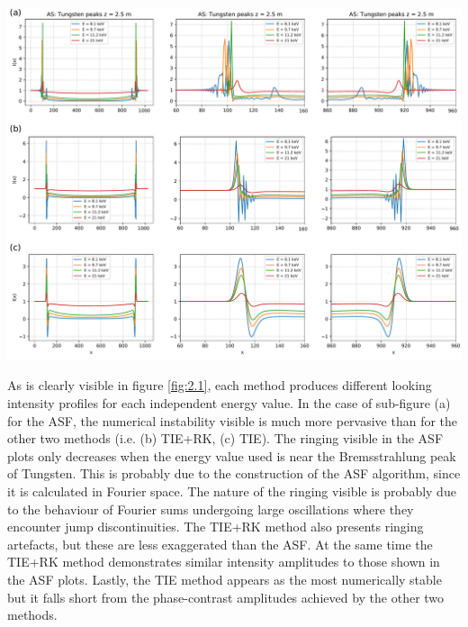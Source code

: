 \documentclass[10pt, a4paper, singlespacing]{report}
\newenvironment{Figure}
    {\par\medskip\noindent\minipage{\linewidth}}
    {\endminipage\par\medskip}
\begin{document}
\begin{Figure} 
 \centering
  \hspace*{-0.9cm}
 \includegraphics[width=\linewidth]{AS_vs_TIE+RK_vs_TIE_1.pdf}
\label{fig:2.1} 
\end{Figure}

As is clearly visible in figure \ref{fig:2.1}, each method produces different looking intensity profiles for each independent energy value. In the case of sub-figure (a) for the ASF, the numerical instability visible is much more pervasive than for the other two methods (i.e. (b) TIE+RK, (c) TIE). The ringing visible in the ASF plots only decreases when the energy value used is near the Bremsstrahlung peak of Tungsten. This is probably due to the construction of the ASF algorithm, since it is calculated in Fourier space. The nature of the ringing visible is probably due to the behaviour of Fourier sums undergoing large oscillations where they encounter jump discontinuities. The TIE+RK method also presents  ringing artefacts, but these are less exaggerated than the ASF. At the same time the TIE+RK method demonstrates similar intensity amplitudes to those shown in the ASF plots.
Lastly, the TIE method appears as the most numerically stable but it falls short from the phase-contrast amplitudes achieved by the other two methods.
\end{document}
